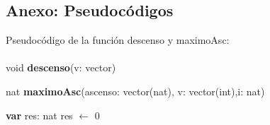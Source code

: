 \subsection{Anexo: Pseudocódigos}
\label{pseudocodigos1}


\vspace*{1cm}
Pseudocódigo de la función descenso y maximoAsc:
\\
\\

void \textbf{descenso}(v: vector)\\
	\begin{algorithm}[H]

  \end{algorithm}

\vspace*{1cm}

nat  \textbf{maximoAsc}(ascenso: vector(nat), v: vector(int),i: nat)\\
	\begin{algorithm}[H]
	
      \textbf{var} res: nat
      res $\leftarrow$ 0
	
  \end{algorithm}



